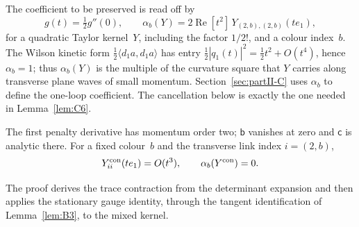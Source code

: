 The coefficient to be preserved is read off by
\begin{equation*}
[t^2]g(t)=\tfrac12g''(0),\qquad\alpha_b(Y)=2\operatorname{Re}[t^2]\,Y_{(2,b),(2,b)}(te_1),
\end{equation*}
for a quadratic Taylor kernel~$Y$, including the factor $1/2!$, and a colour index~$b$. The Wilson kinetic form $\frac12\langle d_1a,d_1a\rangle$ has entry $\frac12|q_1(t)|^2=\frac12t^2+O(t^4)$, hence $\alpha_b=1$; thus $\alpha_b(Y)$ is the multiple of the curvature square that $Y$ carries along transverse plane waves of small momentum. Section~\ref{sec:partII-C} uses $\alpha_b$ to define the one-loop coefficient. The cancellation below is exactly the one needed in Lemma~\ref{lem:C6}.
\begin{lemma}\label{lem:B6}
The first penalty derivative has momentum order two; $\mathsf b$ vanishes at zero and $\mathsf c$ is analytic there. For a fixed colour~$b$ and the transverse link index $i=(2,b)$,
\begin{equation*}
Y^{\rm con}_{ii}(te_1)=O(t^3),\qquad \alpha_b(Y^{\rm con})=0.
\end{equation*}
\end{lemma}
The proof derives the trace contraction from the determinant expansion and then applies the stationary gauge identity, through the tangent identification of Lemma~\ref{lem:B3}, to the mixed kernel.
